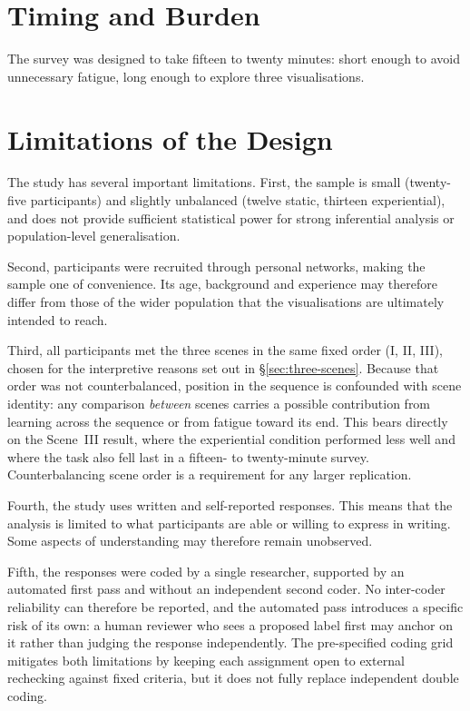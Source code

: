 \section{Timing and Burden}
\label{sec:eval-burden}

The survey was designed to take fifteen to twenty minutes: short enough to avoid unnecessary fatigue, long enough to explore three visualisations.

\section{Limitations of the Design}
\label{sec:eval-limitations}

The study has several important limitations. First, the sample is small (twenty-five participants) and slightly unbalanced (twelve static, thirteen experiential), and does not provide sufficient statistical power for strong inferential analysis or population-level generalisation.

Second, participants were recruited through personal networks, making the sample one of convenience. Its age, background and experience may therefore differ from those of the wider population that the visualisations are ultimately intended to reach.

Third, all participants met the three scenes in the same fixed order (I, II, III), chosen for the interpretive reasons set out in \S\ref{sec:three-scenes}. Because that order was not counterbalanced, position in the sequence is confounded with scene identity: any comparison \emph{between} scenes carries a possible contribution from learning across the sequence or from fatigue toward its end. This bears directly on the Scene~III result, where the experiential condition performed less well and where the task also fell last in a fifteen- to twenty-minute survey. Counterbalancing scene order is a requirement for any larger replication.

Fourth, the study uses written and self-reported responses. This means that the analysis is limited to what participants are able or willing to express in writing. Some aspects of understanding may therefore remain unobserved.

Fifth, the responses were coded by a single researcher, supported by an automated first pass and without an independent second coder. No inter-coder reliability can therefore be reported, and the automated pass introduces a specific risk of its own: a human reviewer who sees a proposed label first may anchor on it rather than judging the response independently. The pre-specified coding grid mitigates both limitations by keeping each assignment open to external rechecking against fixed criteria, but it does not fully replace independent double coding.

